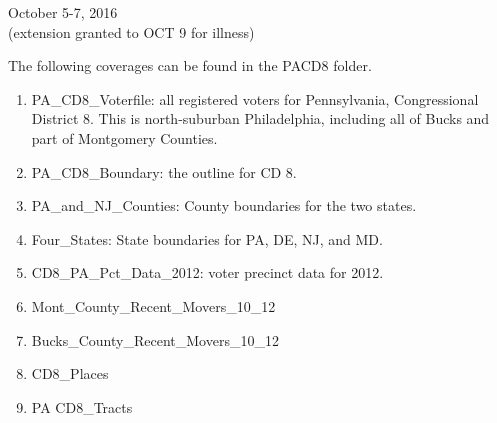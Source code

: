 \documentclass[12pt]{article}
\begin{document}
\begin{titlepage}
	
	
	{\large October 5-7, 2016}\\ (extension granted to OCT 9 for illness)\\[3cm] %
	
	
	
	
	\vfill %
	
\end{titlepage}




The following coverages can be found in the PACD8 folder.

\begin{enumerate}
	\item PA\_CD8\_Voterfile: all registered voters for Pennsylvania, Congressional District 8.  This is north-suburban Philadelphia, including all of Bucks and part of Montgomery Counties.
	\item PA\_CD8\_Boundary: the outline for CD 8.
	\item PA\_and\_NJ\_Counties: County boundaries for the two states.
	\item Four\_States: State boundaries for PA, DE, NJ, and MD. %
	\item CD8\_PA\_Pct\_Data\_2012: voter precinct data for 2012.
	\item Mont\_County\_Recent\_Movers\_10\_12
	\item Bucks\_County\_Recent\_Movers\_10\_12
	\item CD8\_Places
	\item PA CD8\_Tracts
\end{enumerate}
\end{document}
